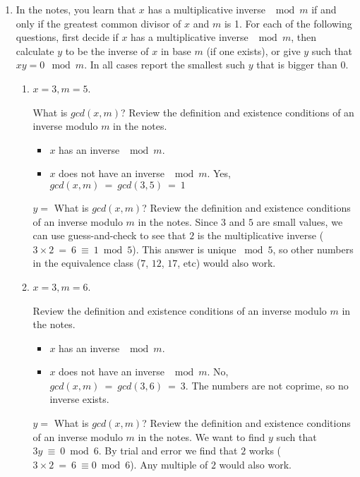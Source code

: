 \documentclass[11pt, preview]{standalone} %
\begin{document}
\begin{enumerate}
\item In the notes, you learn that $x$ has a multiplicative inverse $\mod m$ if and only if the greatest common divisor of $x$ and $m$ is 1. For each of the following questions, first decide if $x$ has a multiplicative inverse $\mod m$, then calculate $y$ to be the inverse of $x$ in base $m$ (if one exists), or give $y$ such that $xy = 0 \mod m$. In all cases report the smallest such $y$ that is bigger than $0$.
\begin{enumerate}
\item $x = 3, m = 5$.
\begin{Choices} 
What is $gcd(x,m)$? Review the definition and existence conditions of an inverse modulo $m$ in the notes.
\begin{itemize}
\TrueChoice\item $x$ has an inverse $\mod m$.
\FalseChoice\item $x$ does not have an inverse $\mod m$.
\Solution Yes, $gcd(x, m)\ =\ gcd(3, 5)\ =\ 1$
\end{itemize}
\end{Choices}
\begin{Freeform}{2}
$y =$ 
\Hint What is $gcd(x,m)$? Review the definition and existence conditions of an inverse modulo $m$ in the notes.
\Solution Since $3$ and $5$ are small values, we can use guess-and-check to see that $2$ is the multiplicative inverse ($3 \times 2\ =\ 6\ \equiv\ 1 \bmod 5$). This answer is unique $\bmod 5$, so other numbers in the equivalence class ($7$, $12$, $17$, etc) would also work.
\end{Freeform}
\item $x = 3, m = 6$.
\begin{Choices} 
Review the definition and existence conditions of an inverse modulo $m$ in the notes.
\begin{itemize}
\FalseChoice\item $x$ has an inverse $\mod m$.
\TrueChoice\item $x$ does not have an inverse $\mod m$.
\Solution No, $gcd(x, m)\ =\ gcd(3, 6)\ =\ 3$. The numbers are not coprime, so no inverse exists.
\end{itemize}
\end{Choices}
\begin{Freeform}{2}
$y =$ 
\Hint What is $gcd(x,m)$? Review the definition and existence conditions of an inverse modulo $m$ in the notes.
\Solution We want to find $y$ such that $3 y\ \equiv\ 0 \bmod 6$. By trial and error we find that $2$ works ($3 \times 2\ =\ 6\ \equiv 0 \bmod 6$). Any multiple of $2$ would also work.

\end{Freeform}
\end{enumerate}
\end{enumerate}
\end{document}
